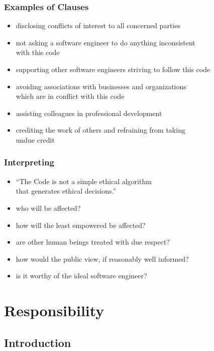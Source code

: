 \documentclass[dvipsnames]{beamer}
\theoremstyle{plain}
\begin{document}
\begin{frame}
  \frametitle{Examples of Clauses}

  \begin{itemize}
    \item disclosing conflicts of interest to all concerned parties
    \item not asking a software engineer to do anything inconsistent\\
      with this code
    \item supporting other software engineers striving to follow this code
    \item avoiding associations with businesses and organizations\\
      which are in conflict with this code
    \item assisting colleagues in professional development
    \item crediting the work of others and refraining from taking\\
      undue credit
  \end{itemize}
\end{frame}

\begin{frame}
  \frametitle{Interpreting}

  \begin{itemize}
    \item ``The Code is \alert{not} a simple ethical algorithm\\
      that generates ethical decisions.''

    \pause
    \bigskip
    \item who will be affected?
    \item how will the least empowered be affected?
    \item are other human beings treated with due respect?
    \item how would the public view, if reasonably well informed?
    \item is it worthy of the ideal software engineer?
  \end{itemize}
\end{frame}

\section{Responsibility}

\subsection{Introduction}
\end{document}
